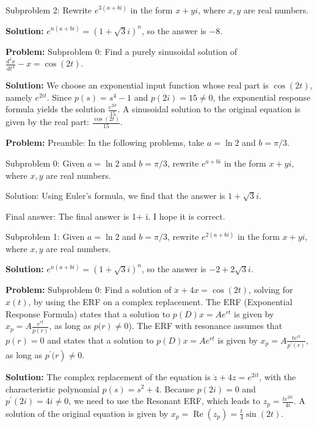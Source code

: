 \documentclass[10pt]{article}
\begin{document}
Subproblem 2: Rewrite $e^{3(a+b i)}$ in the form $x + yi$, where $x, y$ are real numbers. 


\textbf{Solution:}
$e^{n(a+b i)}=(1+\sqrt{3} i)^{n}$, so the answer is $\boxed{-8}$.


\textbf{Problem:}
Subproblem 0: Find a purely sinusoidal solution of $\frac{d^{4} x}{d t^{4}}-x=\cos (2 t)$.


\textbf{Solution:}
We choose an exponential input function whose real part is $\cos (2 t)$, namely $e^{2 i t}$. Since $p(s)=s^{4}-1$ and $p(2 i)=15 \neq 0$, the exponential response formula yields the solution $\frac{e^{2 i t}}{15}$. A sinusoidal solution to the original equation is given by the real part: $\boxed{\frac{\cos (2 t)}{15}}$. 


\textbf{Problem:}
Preamble: In the following problems, take $a = \ln 2$ and $b = \pi / 3$. 

Subproblem 0: Given $a = \ln 2$ and $b = \pi / 3$, rewrite $e^{a+b i}$ in the form $x + yi$, where $x, y$ are real numbers. 


Solution: Using Euler's formula, we find that the answer is $\boxed{1+\sqrt{3} i}$.

Final answer: The final answer is 1+ i. I hope it is correct.

Subproblem 1: Given $a = \ln 2$ and $b = \pi / 3$, rewrite $e^{2(a+b i)}$ in the form $x + yi$, where $x, y$ are real numbers.


\textbf{Solution:}
$e^{n(a+b i)}=(1+\sqrt{3} i)^{n}$, so the answer is $\boxed{-2+2 \sqrt{3} i}$.


\textbf{Problem:}
Subproblem 0: Find a solution of $\ddot{x}+4 x=\cos (2 t)$, solving for $x(t)$, by using the ERF on a complex replacement. The ERF (Exponential Response Formula) states that a solution to $p(D) x=A e^{r t}$ is given by $x_{p}=A \frac{e^{r t}}{p(r)}$, as long as $\left.p (r\right) \neq 0$). The ERF with resonance assumes that $p(r)=0$ and states that a solution to $p(D) x=A e^{r t}$ is given by $x_{p}=A \frac{t e^{r t}}{p^{\prime}(r)}$, as long as $\left.p^{\prime} ( r\right) \neq 0$.


\textbf{Solution:}
The complex replacement of the equation is $\ddot{z}+4 z=e^{2 i t}$, with the characteristic polynomial $p(s)=s^{2}+4$. Because $p(2 i)=0$ and $p^{\prime}(2 i)=4 i \neq 0$, we need to use the Resonant ERF, which leads to $z_{p}=\frac{t e^{2 i t}}{4 i}$. A solution of the original equation is given by $x_{p}=\operatorname{Re}\left(z_{p}\right)=\boxed{\frac{t}{4} \sin (2 t)}$.
\end{document}
